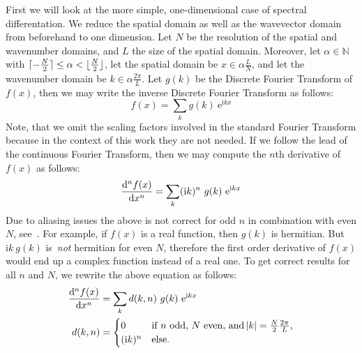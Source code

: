 First we will look at the more simple, one-dimensional case of spectral
differentation. We reduce the spatial domain as well as the wavevector domain
from beforehand to one dimension. Let $N$ be the resolution of the spatial
and wavenumber domains, and $L$ the size of the spatial domain. Moreover, let
$\alpha \in \mathbb{N}$ with $\lceil-\frac{N}{2}\rceil \leq \alpha < \lfloor\frac{N}{2}\rfloor$,
let the spatial domain be $x \in \alpha \frac{L}{N}$, and let the wavenumber
domain be $k \in \alpha \frac{2\pi}{L}$. Let $g(k)$ be the Discrete Fourier
Transform of $f(x)$, then we may write the inverse Discrete Fourier Transform
as follows:
\begin{equation}
 f(x) = \sum_{k}g(k)~\mathrm{e}^{\mathrm{i}kx}
\end{equation}
Note, that we omit the scaling factors involved in the standard Fourier Transform
because in the context of this work they are not needed. If we follow the
lead of the continuous Fourier Transform, then we may compute the $n$th
derivative of $f(x)$ as follows:
\begin{equation}
  \dod[n]{f(x)}{x} = \sum_{k}(\mathrm{i}k)^n~g(k)~\mathrm{e}^{\mathrm{i}kx}
\end{equation}
Due to aliasing issues the above is not correct for odd $n$ in combination
with even $N$, see~\cite{Johnson:2011}. For example, if $f(x)$ is a real
function, then $g(k)$ is hermitian.
But $\mathrm{i}k~g(k)$ is~\emph{not} hermitian for even $N$, therefore the first
order derivative of $f(x)$ would end up a complex function instead of a real one.
To get correct results for all $n$ and $N$, we rewrite the above equation as follows:
\begin{align}
\label{eq:dft_derivative}
  \dod[n]{f(x)}{x} &= \sum_{k}d(k, n)~g(k)~\mathrm{e}^{\mathrm{i}kx} \\
\label{eq:dft_derivative_correction}
  d(k, n) &= \begin{cases}
                   0 &\text{if $n$ odd, $N$ even, and $\abs{k} 
= \frac{N}{2}\frac{2\pi}{L}$,} \\
                   (\mathrm{i}k)^n &\text{else.}
                   \end{cases}
\end{align}
%

